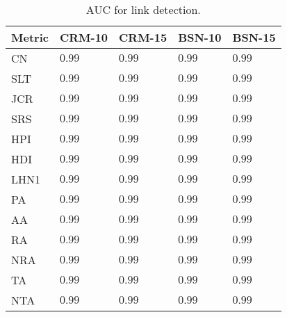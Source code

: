 
\begin{table}[h]
	\centering
	\begin{tabular}{l l l l l}
	\toprule
	\textbf{Metric} & \textbf{CRM-10} & \textbf{CRM-15} & \textbf{BSN-10} & \textbf{BSN-15}\\
	\midrule
		CN & $0.99$ & $0.99$ & $0.99$ & $0.99$ \\
		SLT  & $0.99$ & $0.99$ & $0.99$ & $0.99$ \\
		JCR  & $0.99$ & $0.99$ & $0.99$ & $0.99$ \\
		SRS   & $0.99$ & $0.99$ & $0.99$ & $0.99$ \\
		HPI  & $0.99$ & $0.99$ & $0.99$ & $0.99$ \\
		HDI  & $0.99$ & $0.99$ & $0.99$ & $0.99$ \\
		LHN1  & $0.99$ & $0.99$ & $0.99$ & $0.99$ \\
		PA  & $0.99$ & $0.99$ & $0.99$ & $0.99$ \\
		AA  & $0.99$ & $0.99$ & $0.99$ & $0.99$ \\
		RA  & $0.99$ & $0.99$ & $0.99$ & $0.99$ \\
		NRA  & $0.99$ & $0.99$ & $0.99$ & $0.99$ \\
		TA  & $0.99$ & $0.99$ & $0.99$ & $0.99$ \\
		NTA  & $0.99$ & $0.99$ & $0.99$ & $0.99$ \\
	\bottomrule
	\end{tabular}
	\label{tab:auc-detection}
	\caption{AUC for link detection.}
\end{table}

